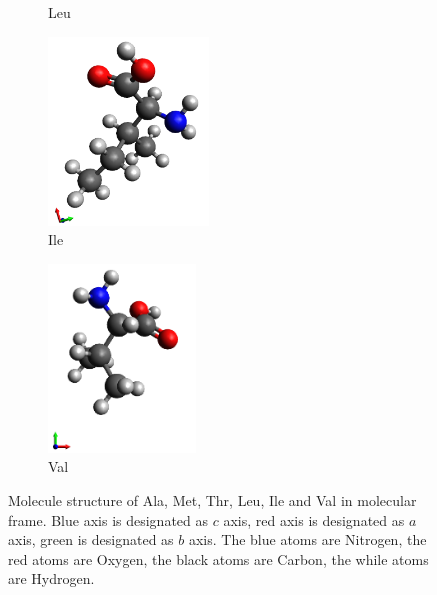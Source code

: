 \begin{figure}
\begin{subfigure}{.5\textwidth}
  \caption{Leu}
  \label{fig:sfig4}
\end{subfigure}
\begin{subfigure}{.5\textwidth}
  \centering
  \includegraphics[height=5cm]{Figures/Ile.png}
  \caption{Ile}
  \label{fig:sfig5}
\end{subfigure}
\begin{subfigure}{.5\textwidth}
  \centering
  \includegraphics[height=5cm]{Figures/Val.png}
  \caption{Val}
  \label{fig:sfig6}
\end{subfigure}
\caption{Molecule structure of Ala, Met, Thr, Leu, Ile and Val in molecular frame. Blue axis is designated as $c$ axis, red axis is designated as $a$ axis, green is designated as $b$ axis. The blue atoms are Nitrogen, the red atoms are Oxygen, the black atoms are Carbon, the while atoms are Hydrogen.}
\label{fig:aminacids}
\end{figure}

